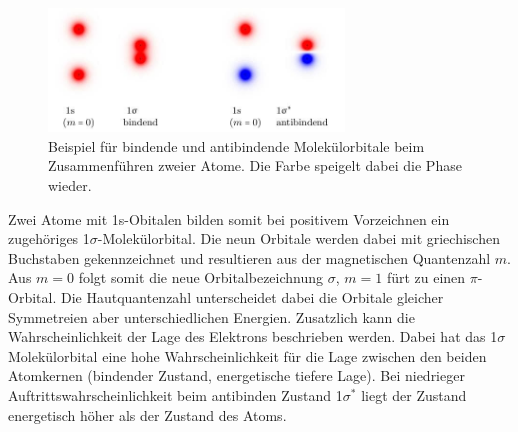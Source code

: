 \begin{figure}
    \center
    \includegraphics[width=0.7\textwidth]{bilder/mol_orbitale.jpg}
    \caption{Beispiel für bindende und antibindende Molekülorbitale beim Zusammenführen zweier Atome.
    Die Farbe speigelt dabei die Phase wieder.}
\end{figure}
Zwei Atome mit 1s-Obitalen bilden somit bei positivem Vorzeichnen ein zugehöriges 1$\sigma$-Molekülorbital. Die neun Orbitale werden dabei mit
griechischen Buchstaben gekennzeichnet und resultieren aus der magnetischen Quantenzahl $m$. Aus $m=0$ folgt somit die neue Orbitalbezeichnung 
$\sigma$, $m=1$ fürt zu einen $\pi$-Orbital.
Die Hautquantenzahl unterscheidet dabei die Orbitale gleicher Symmetreien aber unterschiedlichen Energien.
Zusatzlich kann die Wahrscheinlichkeit der Lage des Elektrons beschrieben werden. Dabei hat das 1$\sigma$ Molekülorbital eine hohe Wahrscheinlichkeit für die Lage zwischen
den beiden Atomkernen (bindender Zustand, energetische tiefere Lage). Bei niedrieger Auftrittswahrscheinlichkeit beim
antibinden Zustand 1$\sigma^*$ liegt der Zustand energetisch höher als der Zustand des Atoms.









